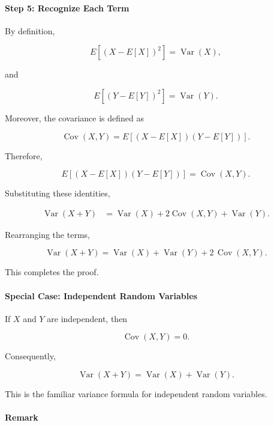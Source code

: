 \documentclass[11pt]{article}
\begin{document}
\begin{mdframed}[
		linewidth=0.8pt,
		roundcorner=6pt,
		backgroundcolor=gray!5,
		linecolor=gray!60,
		innertopmargin=10pt,
		innerbottommargin=10pt,
		innerleftmargin=10pt,
		innerrightmargin=10pt
		]
		\bigskip
		
		\paragraph{Step 5: Recognize Each Term}
		
		By definition,
		
		\[
		E[(X-E[X])^2]
		=
		\operatorname{Var}(X),
		\]
		
		and
		
		\[
		E[(Y-E[Y])^2]
		=
		\operatorname{Var}(Y).
		\]
		
		Moreover, the covariance is defined as
		
		\[
		\boxed{
			\operatorname{Cov}(X,Y)
			=
			E[(X-E[X])(Y-E[Y])].
		}
		\]
		
		Therefore,
		
		\[
		E[(X-E[X])(Y-E[Y])]
		=
		\operatorname{Cov}(X,Y).
		\]
		
		Substituting these identities,
		
		\[
		\begin{aligned}
			\operatorname{Var}(X+Y)
			&=
			\operatorname{Var}(X)
			+
			2\operatorname{Cov}(X,Y)
			+
			\operatorname{Var}(Y).
		\end{aligned}
		\]
		
		Rearranging the terms,
		
		\[
		\boxed{
			\operatorname{Var}(X+Y)
			=
			\operatorname{Var}(X)
			+
			\operatorname{Var}(Y)
			+
			2\,\operatorname{Cov}(X,Y).
		}
		\]
		
		This completes the proof.
		
		\bigskip
		
		\paragraph{Special Case: Independent Random Variables}
		
		If \(X\) and \(Y\) are independent, then
		
		\[
		\operatorname{Cov}(X,Y)=0.
		\]
		
		Consequently,
		
		\[
		\boxed{
			\operatorname{Var}(X+Y)
			=
			\operatorname{Var}(X)
			+
			\operatorname{Var}(Y).
		}
		\]
		
		This is the familiar variance formula for independent random variables.
		
		\bigskip
		
		\paragraph{Remark}
		

\end{mdframed}
\end{document}

